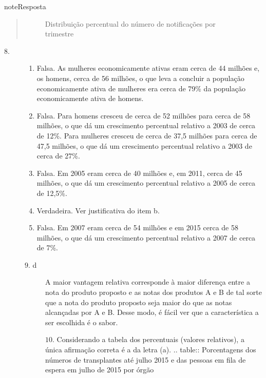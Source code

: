 \begin{sphinxadmonition}{note}{Resposta}
\begin{quote}
\begin{figure}[H]
\noindent{}
\caption{Distribuição percentual do número de notificações por trimestre}\label{\detokenize{PE103-E:id30}}\end{figure}
\end{quote}
\begin{description}
\item[{\(8.\)}] \leavevmode\begin{enumerate}
\item {} 
Falsa. As mulheres economicamente ativas eram cerca de 44 milhões e, os homens, cerca de 56 milhões, o que leva a concluir a população economicamente ativa de mulheres era cerca de 79\% da população economicamente ativa de homens.

\item {} 
Falsa. Para homens cresceu de cerca de 52 milhões para cerca de 58 milhões, o que dá um crescimento percentual relativo a 2003 de cerca de 12\%. Para mulheres cresceu de cerca de 37,5 milhões para cerca de 47,5 milhões, o que dá um crescimento percentual relativo a 2003 de cerca de 27\%.

\item {} 
Falsa. Em 2005 eram cerca de 40 milhões e, em 2011, cerca de 45 milhões, o que dá um crescimento percentual relativo a 2005 de cerca de 12,5\%.

\item {} 
Verdadeira. Ver justificativa do item b.

\item {} 
Falsa. Em 2007 eram cerca de 54 milhões e em 2015 cerca de 58 milhões, o que dá um crescimento percentual relativo a 2007 de cerca de 7\%.

\end{enumerate}
\begin{description}
\item[{\(9.\) d}] \leavevmode
A maior vantagem relativa corresponde à maior diferença entre a nota do produto proposto e as notas dos produtos A e B de tal sorte que a nota do produto proposto seja maior do que as notas alcançadas por A  e B.  Desse modo, é fácil ver que a característica a ser escolhida é o sabor.

\(10.\) Considerando a tabela dos percentuais (valores relativos), a única afirmação correta é a da letra (a).
.. table:: Porcentagens dos números de transplantes até julho 2015 e das pessoas em fila de espera em julho de 2015 por órgão



\end{description}
\end{description}
\end{sphinxadmonition}
